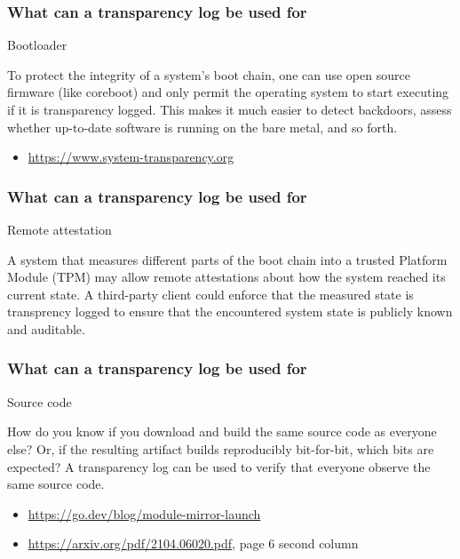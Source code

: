 \begin{frame}
  \frametitle{What can a transparency log be used for}

  Bootloader
  \pause

  To protect the integrity of a system's boot chain, one can use open
  source firmware (like coreboot) and only permit the operating system
  to start executing if it is transparency logged. This makes it much
  easier to detect backdoors, assess whether up-to-date software is
  running on the bare metal, and so forth.

  \begin{itemize}
  \item \url{https://www.system-transparency.org}
  \end{itemize}
\end{frame}

\begin{frame}
  \frametitle{What can a transparency log be used for}

  Remote attestation
  \pause

  A system that measures different parts of the boot chain into a
  trusted Platform Module (TPM) may allow remote attestations about
  how the system reached its current state. A third-party client
  could enforce that the measured state is transprency logged to
  ensure that the encountered system state is publicly known and
  auditable.
\end{frame}

\begin{frame}
  \frametitle{What can a transparency log be used for}

  Source code
  \pause

  How do you know if you download and build the same source code as
  everyone else?  Or, if the resulting artifact builds reproducibly
  bit-for-bit, which bits are expected?  A transparency log can be
  used to verify that everyone observe the same source code.

  \begin{itemize}
  \item \url{https://go.dev/blog/module-mirror-launch}
  \item \url{https://arxiv.org/pdf/2104.06020.pdf}, page 6 second
    column
  \end{itemize}

\end{frame}

